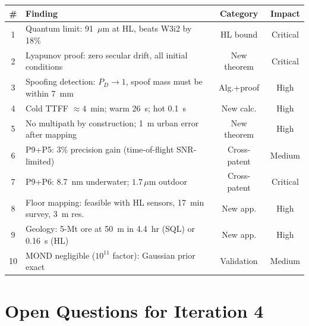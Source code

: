 \documentclass[aps,prd,twocolumn,superscriptaddress,nofootinbib]{revtex4-2}
\begin{document}
\begin{center}
\begin{tabular}{clcc}
\toprule
\# & Finding & Category & Impact \\
\midrule
1 & Quantum limit: 91~$\mu$m at HL, beats W3i2 by 18\% & HL bound & Critical \\
2 & Lyapunov proof: zero secular drift, all initial conditions & New theorem & Critical \\
3 & Spoofing detection: $P_D \to 1$, spoof mass must be within 7~mm & Alg.+proof & High \\
4 & Cold TTFF $\approx 4$~min; warm 26~s; hot 0.1~s & New calc. & High \\
5 & No multipath by construction; 1~m urban error after mapping & New theorem & High \\
6 & P9+P5: 3\% precision gain (time-of-flight SNR-limited) & Cross-patent & Medium \\
7 & P9+P6: 8.7~nm underwater; $1.7\,\mu$m outdoor & Cross-patent & Critical \\
8 & Floor mapping: feasible with HL sensors, 17~min survey, 3~m res. & New app. & High \\
9 & Geology: 5-Mt ore at 50~m in 4.4~hr (SQL) or 0.16~s (HL) & New app. & High \\
10 & MOND negligible ($10^{11}$ factor): Gaussian prior exact & Validation & Medium \\
\bottomrule
\end{tabular}
\end{center}

\section{Open Questions for Iteration 4}
\label{sec:open}
\end{document}
